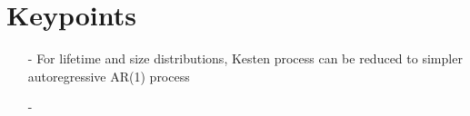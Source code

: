 \section{Keypoints}

\begin{itemize}
\item[-] For lifetime and size distributions, Kesten process can be reduced to simpler autoregressive AR(1) process
\item[-] 
\end{itemize}

